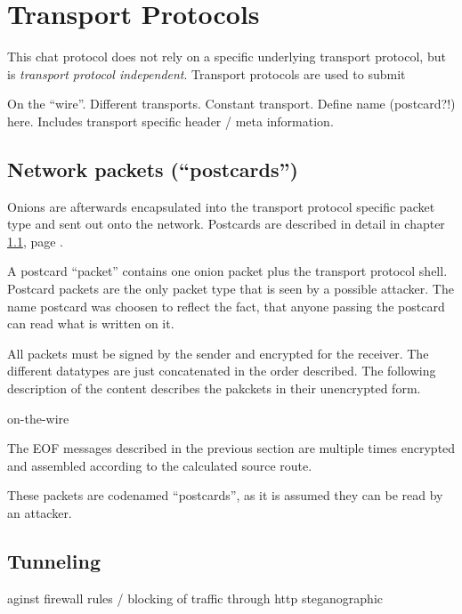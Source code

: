 \section{Transport Protocols}
This chat protocol does not rely on a specific underlying transport protocol,
but is \textit{transport protocol independent}. Transport protocols are used
to submit 


On the "`wire"'. Different transports. Constant transport.
Define name (postcard?!) here. Includes transport specific
header / meta information.

\subsection{Network packets ("`postcards"')}
\label{postcards}
Onions are afterwards encapsulated into the transport protocol specific
packet type and sent out onto the network.
Postcards are described in detail in chapter \ref{postcards}, page \pageref{postcards}.

A postcard "`packet"' contains one onion packet plus the transport protocol
shell.  Postcard packets are the only packet type that is seen by a possible
attacker.  The name postcard was choosen to reflect the fact, that anyone
passing the postcard can read what is written on it.

All packets must be signed by the sender and encrypted for the receiver.
The different datatypes are just concatenated in the order described.
The following description of the content describes the pakckets
in their unencrypted form.

on-the-wire


The EOF messages described in the previous section are multiple times
encrypted and assembled according to the calculated source route.

These packets are codenamed "`postcards"', as it is assumed they can be read
by an attacker.
\subsection{Tunneling}
\label{tunneling}
aginst firewall rules / blocking of traffic
through http
steganographic

